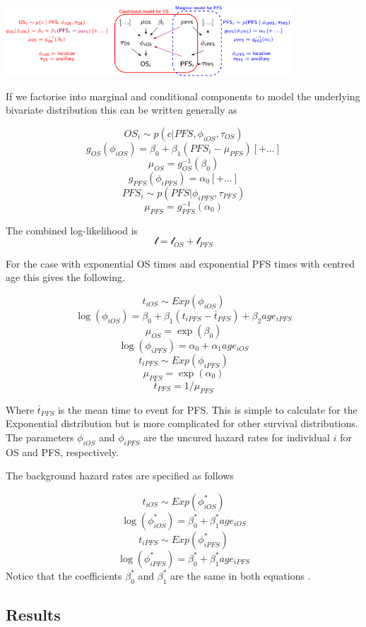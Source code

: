 \documentclass[
]{article}
\begin{document}
\includegraphics[width=0.8\textwidth,height=\textheight]{DAG.png}

If we factorise into marginal and conditional components to model the
underlying bivariate distribution this can be written generally as

\[
OS_i \sim p(c | PFS, \phi_{iOS}, \tau_{OS})
\] \[
g_{OS}(\phi_{iOS}) = \beta_0 + \beta_1 (PFS_i - \mu_{PFS})[+ \ldots]
\] \[
\mu_{OS} = g_{OS}^{-1}(\beta_0)
\] \[
g_{PFS}(\phi_{iPFS}) = \alpha_0 [+ \ldots]
\] \[
PFS_i \sim p(PFS | \phi_{iPFS}, \tau_{PFS})
\] \[
\mu_{PFS} = g_{PFS}^{-1}(\alpha_0)
\]

The combined log-likelihood is \[
\mathcal{l} = \mathcal{l}_{OS} + \mathcal{l}_{PFS}
\]

For the case with exponential OS times and exponential PFS times with
centred age this gives the following.

\[
t_{iOS} \sim Exp(\phi_{iOS})
\] \[
\log(\phi_{iOS}) = \beta_0 + \beta_1 (t_{iPFS} - \bar{t}_{PFS}) + \beta_2 age_{iPFS}
\] \[
\mu_{OS} = \exp(\beta_0)
\] \[
\log(\phi_{iPFS}) = \alpha_0 + \alpha_1 age_{iOS}
\] \[
t_{iPFS} \sim Exp(\phi_{iPFS})
\] \[
\mu_{PFS} = \exp(\alpha_0)
\] \[
\bar{t}_{PFS} = 1/\mu_{PFS} 
\]

Where \(\bar{t}_{PFS}\) is the mean time to event for PFS. This is
simple to calculate for the Exponential distribution but is more
complicated for other survival distributions. The parameters
\(\phi_{iOS}\) and \(\phi_{iPFS}\) are the uncured hazard rates for
individual \(i\) for OS and PFS, respectively.

The background hazard rates are specified as follows

\[
t_{iOS} \sim Exp(\phi^*_{iOS})
\] \[
\log(\phi^*_{iOS}) = \beta_0^* + \beta^*_1 age_{iOS}
\] \[
t_{iPFS} \sim Exp(\phi^*_{iPFS})
\] \[
\log(\phi^*_{iPFS}) = \beta_0^* + \beta^*_1 age_{iPFS}
\] Notice that the coefficients \(\beta_0^*\) and \(\beta^*_1\) are the
same in both equations .

\hypertarget{results}{%
\subsection{Results}\label{results}}
\end{document}
